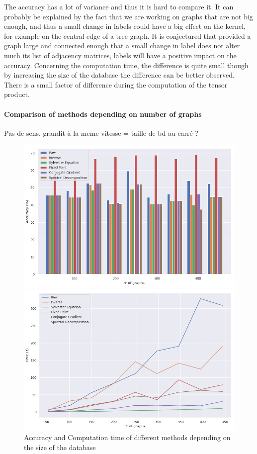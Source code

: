 \documentclass{article}
\theoremstyle{definition}
\begin{document}
The accuracy has a lot of variance and thus it is hard to compare it. It can probably be explained by the fact that we are working on graphs that are not big enough, and thus a small change in labels could have a big effect on the kernel, for example on the central edge of a tree graph. It is conjectured that provided a graph large and connected enough that a small change in label does not alter much its list of adjacency matrices, labels will have a positive impact on the accuracy. Concerning the computation time, the difference is quite small though by increasing the size of the database the difference can be better observed. There is a small factor of difference during the computation of the tensor product.
\paragraph{Comparison of methods depending on  number of graphs}
Pas de sens, grandit à la meme vitesse = taille de bd au carré ?
\begin{figure}[!htb]
	\begin{multicols}{2}
		\includegraphics[width=\linewidth]{data/nb_graph/acc.png}\par
		\includegraphics[width=\linewidth]{data/nb_graph/time.png}\par
	\end{multicols}
	\caption{Accuracy and Computation time of different methods depending on the size of the database}
\end{figure}
\end{document}
